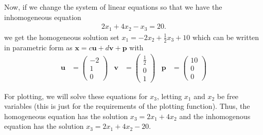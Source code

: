 \documentclass[
]{book}
\theoremstyle{definition}
\theoremstyle{definition}
\theoremstyle{definition}
\theoremstyle{definition}
\theoremstyle{remark}
\begin{document}
Now, if we change the system of linear equations so that we have the inhomogeneous equation
\[
\begin{aligned}
2x_1 + 4 x_2 - x_3 = 20.
\end{aligned}
\]
we get the homogeneous solution set \(x_1 = -2 x_2 + \frac{1}{2} x_3 + 10\) which can be written in parametric form as \(\mathbf{x} = c \mathbf{u} + d \mathbf{v} + \mathbf{p}\) with
\[
\begin{aligned}
\mathbf{u} & = \begin{pmatrix} -2 \\ 1 \\ 0 \end{pmatrix} & 
\mathbf{v} & = \begin{pmatrix} \frac{1}{2} \\ 0 \\ 1 \end{pmatrix} & 
\mathbf{p} & = \begin{pmatrix} 10 \\ 0 \\ 0 \end{pmatrix}
\end{aligned}
\]

For plotting, we will solve these equations for \(x_3\), letting \(x_1\) and \(x_2\) be free variables (this is just for the requirements of the plotting function). Thus, the homogeneous equation has the solution \(x_3 = 2x_1 + 4x_2\) and the inhomogenous equation has the solution \(x_3 = 2x_1 + 4x_2 - 20\).
\end{document}
